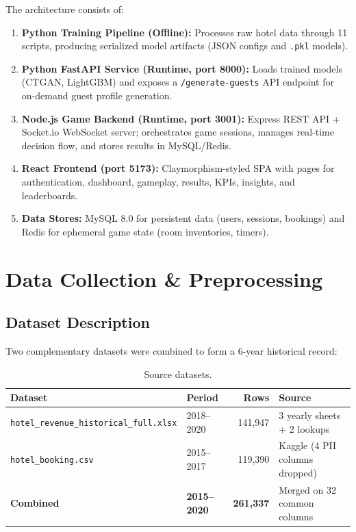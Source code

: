 \documentclass[12pt,a4paper,openany]{report}
\begin{document}
The architecture consists of:
\begin{enumerate}
  \item \textbf{Python Training Pipeline (Offline):} Processes raw hotel data through 11 scripts, producing serialized model artifacts (JSON configs and \texttt{.pkl} models).
  \item \textbf{Python FastAPI Service (Runtime, port 8000):} Loads trained models (CTGAN, LightGBM) and exposes a \texttt{/generate-guests} API endpoint for on-demand guest profile generation.
  \item \textbf{Node.js Game Backend (Runtime, port 3001):} Express REST API + Socket.io WebSocket server; orchestrates game sessions, manages real-time decision flow, and stores results in MySQL/Redis.
  \item \textbf{React Frontend (port 5173):} Claymorphism-styled SPA with pages for authentication, dashboard, gameplay, results, KPIs, insights, and leaderboards.
  \item \textbf{Data Stores:} MySQL 8.0 for persistent data (users, sessions, bookings) and Redis for ephemeral game state (room inventories, timers).
\end{enumerate}


\section{Data Collection \& Preprocessing}

\subsection{Dataset Description}

Two complementary datasets were combined to form a 6-year historical record:

\begin{table}[H]
\centering
\caption{Source datasets.}
\label{tab:datasets}
\begin{tabular}{@{}llrl@{}}
\toprule
\textbf{Dataset} & \textbf{Period} & \textbf{Rows} & \textbf{Source} \\
\midrule
\texttt{hotel\_revenue\_historical\_full.xlsx} & 2018--2020 & 141,947 & 3 yearly sheets + 2 lookups \\
\texttt{hotel\_booking.csv}                    & 2015--2017 & 119,390 & Kaggle (4 PII columns dropped) \\
\textbf{Combined}                              & \textbf{2015--2020} & \textbf{261,337} & Merged on 32 common columns \\
\bottomrule
\end{tabular}
\end{table}
\end{document}
